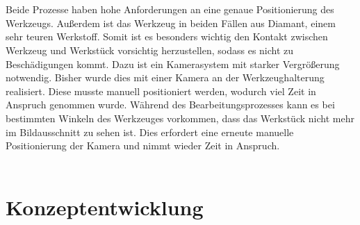 \documentclass[12pt,a4paper,bibliography=totocnumbered,listof=totocnumbered]{scrartcl}
\begin{document}
\break
\pagebreak
\\ \\
Beide Prozesse haben hohe Anforderungen an eine genaue Positionierung des Werkzeugs. Außerdem ist das Werkzeug in beiden Fällen aus Diamant, einem sehr teuren Werkstoff. Somit ist es besonders wichtig den Kontakt zwischen Werkzeug und Werkstück vorsichtig herzustellen, sodass es nicht zu Beschädigungen kommt. Dazu ist ein Kamerasystem mit starker Vergrößerung notwendig. Bisher wurde dies mit einer Kamera an der Werkzeughalterung realisiert. Diese musste manuell positioniert werden, wodurch viel Zeit in Anspruch genommen wurde. Während des Bearbeitungsprozesses kann es bei bestimmten Winkeln des Werkzeuges vorkommen, dass das Werkstück nicht mehr im Bildausschnitt zu sehen ist. Dies erfordert eine erneute manuelle Positionierung der Kamera und nimmt wieder Zeit in Anspruch. \\ \\

\section{Konzeptentwicklung}
\end{document}
